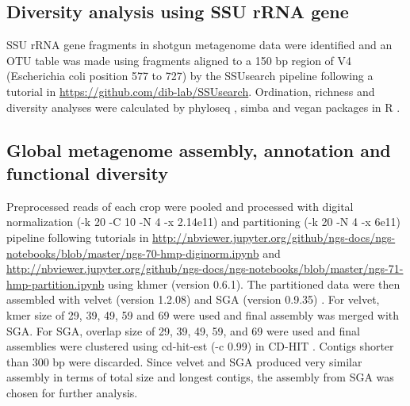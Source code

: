 \documentclass[]{msu-thesis}
\begin{document}
\subsection{Diversity analysis using SSU rRNA gene}
SSU rRNA gene fragments in shotgun metagenome data were identified and
an OTU table was made using fragments aligned to a 150 bp region of V4
(Escherichia coli position 577 to 727) by the SSUsearch pipeline
\cite{guo_microbial_2015} following a tutorial in
\url{https://github.com/dib-lab/SSUsearch}.  Ordination, richness and
diversity analyses were calculated by phyloseq
\cite{mcmurdie_phyloseq:_2013}, simba \cite{jurasinski_simba:_2012} and
vegan \cite{oksanen_vegan:_2015} packages in R
\cite{r_core_team_r:_2014}.

\begin{sloppypar}
\subsection{Global metagenome assembly, annotation and functional diversity} 
Preprocessed reads of each crop were pooled and processed with digital
normalization (-k 20 -C 10 -N 4 -x 2.14e11) and partitioning (-k 20 -N 4
-x 6e11) pipeline \cite{howe_tackling_2014} following tutorials in
\url{http://nbviewer.jupyter.org/github/ngs-docs/ngs-notebooks/blob/master/ngs-70-hmp-diginorm.ipynb}
and  
\url{http://nbviewer.jupyter.org/github/ngs-docs/ngs-notebooks/blob/master/ngs-71-hmp-partition.ipynb}
using khmer (version 0.6.1). The partitioned data were then assembled
with velvet (version 1.2.08) \cite{zerbino_velvet:_2008} and SGA
(version 0.9.35) \cite{simpson_efficient_2012}. For velvet, kmer size of
29, 39, 49, 59 and 69 were used and final assembly was merged with SGA.
For SGA, overlap size of 29, 39, 49, 59, and 69 were used and final
assemblies were clustered using cd-hit-est (-c 0.99) in CD-HIT
\cite{li_cd-hit:_2006}. Contigs shorter than 300 bp were discarded.
Since velvet and SGA produced very similar assembly in terms of total
size and longest contigs, the assembly from SGA was chosen for further
analysis.
\end{sloppypar}
\end{document}
